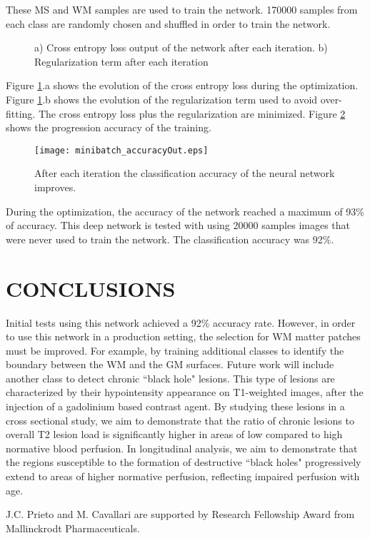 \documentclass[]{spie}  %
\begin{document}
These MS and WM samples are used to train the network. 
170000 samples from each class are randomly chosen and shuffled in order to train the network. 

\begin{figure}
	\centering 
	\caption[Cross entropy]{a) Cross entropy loss output of the network after each iteration. b) Regularization term after each iteration}
	\label{fig:cross_entropy}
\end{figure}
Figure \ref{fig:cross_entropy}.a shows the evolution of the cross entropy loss during the optimization.
Figure \ref{fig:cross_entropy}.b shows the evolution of the regularization term used to avoid over-fitting. 
The cross entropy loss plus the regularization are minimized. Figure \ref{fig:accuracy} shows the progression accuracy of the training. 
\begin{figure}
	\centering 
	\texttt{[image: minibatch\_accuracyOut.eps]}
	\caption[Accuracy of the minibatch]{After each iteration the classification accuracy of the neural network improves.}
	\label{fig:accuracy}
\end{figure}

During the optimization, the accuracy of the network reached a maximum of 93\% of accuracy. 
This deep network is tested with using 20000 samples images that were never used to train the network.
The classification accuracy was 92\%.

\section{CONCLUSIONS} 

Initial tests using this network achieved a 92\% accuracy rate. However, in order to use this network in a production setting,
the selection for WM matter patches must be improved. For example, by training additional classes to identify the boundary between 
the WM and the GM surfaces. 
Future work will include another class to detect chronic ``black hole" lesions. This type of lesions are characterized by their hypointensity appearance on T1-weighted images, after the injection of a gadolinium based contrast agent.
By studying these lesions in a cross sectional study, we aim to demonstrate that the ratio of chronic lesions to overall T2 lesion load is significantly higher in areas of low compared to high normative blood perfusion. In longitudinal analysis, we aim to demonstrate that the regions susceptible to the formation of destructive ``black holes" progressively extend to areas of higher normative perfusion, reflecting impaired perfusion with age.

\acknowledgments

J.C. Prieto and M. Cavallari are supported by Research Fellowship Award from Mallinckrodt Pharmaceuticals.


\end{document}
